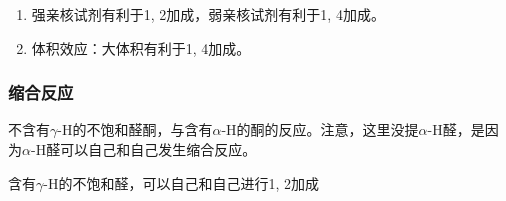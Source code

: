     \begin{enumerate}
        \item 强亲核试剂有利于1, 2加成，弱亲核试剂有利于1, 4加成。
        \item 体积效应：大体积有利于1, 4加成。
    \end{enumerate}

    \subsubsection{缩合反应}

    不含有$\gamma$-H的不饱和醛酮，与含有$\alpha$-H的酮的反应。注意，这里没提$\alpha$-H醛，是因为$\alpha$-H醛可以自己和自己发生缩合反应。
    \begin{centering}
        
    \end{centering}

    含有$\gamma$-H的不饱和醛，可以自己和自己进行1, 2加成


